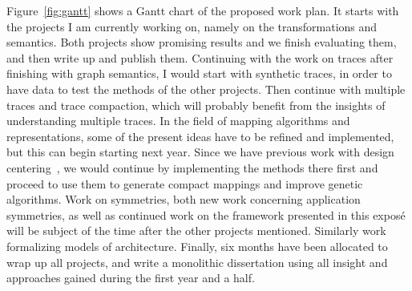 \documentclass[sigplan,10pt]{acmart}
\begin{document}
Figure~\ref{fig:gantt} shows a Gantt chart of the proposed work plan. It starts with the projects I am currently working on, namely on the transformations and semantics. Both projects show promising results and we finish evaluating them, and then write up and publish them.
Continuing with the work on traces after finishing with graph semantics, I would start with synthetic traces, in order to have data to test the methods of the other projects. Then continue with multiple traces and trace compaction, which will probably benefit from the insights of understanding multiple traces.
In the field of mapping algorithms and representations, some of the present ideas have to be refined and implemented, but this can begin starting next year. Since we have previous work with design centering~\cite{hempel2017robust}, we would continue by implementing the methods there first and proceed to use them to generate compact mappings and improve genetic algorithms.
Work on symmetries, both new work concerning application symmetries, as well as continued work on the framework presented in this exposé will be subject of the time after the other projects mentioned. Similarly work formalizing models of architecture. Finally, six months have been allocated to wrap up all projects, and write a monolithic dissertation using all insight and approaches gained during the first year and a half.





%

 
\end{document}
